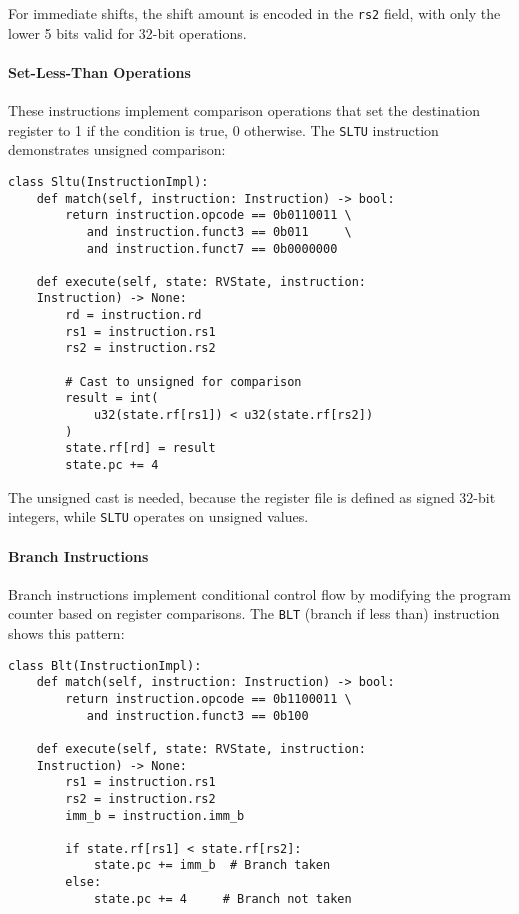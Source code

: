 \documentclass[sigconf]{acmart}
\begin{document}
For immediate shifts, the shift amount is encoded in the \texttt{rs2} field, with only the lower 5 bits valid for 32-bit operations.

\paragraph{Set-Less-Than Operations}
These instructions implement comparison operations that set the destination register to 1 if the condition is true, 0 otherwise. The \texttt{SLTU} instruction demonstrates unsigned comparison:

\begin{verbatim}
class Sltu(InstructionImpl):
    def match(self, instruction: Instruction) -> bool:
        return instruction.opcode == 0b0110011 \
           and instruction.funct3 == 0b011     \
           and instruction.funct7 == 0b0000000
    
    def execute(self, state: RVState, instruction: 
    Instruction) -> None:
        rd = instruction.rd
        rs1 = instruction.rs1
        rs2 = instruction.rs2
        
        # Cast to unsigned for comparison
        result = int(
            u32(state.rf[rs1]) < u32(state.rf[rs2])
        )
        state.rf[rd] = result
        state.pc += 4
\end{verbatim}

The unsigned cast is needed, because the register file is defined as signed 32-bit integers, while \texttt{SLTU} operates on unsigned values.

\paragraph{Branch Instructions}
Branch instructions implement conditional control flow by modifying the program counter based on register comparisons. The \texttt{BLT} (branch if less than) instruction shows this pattern:

\begin{verbatim}
class Blt(InstructionImpl):
    def match(self, instruction: Instruction) -> bool:
        return instruction.opcode == 0b1100011 \
           and instruction.funct3 == 0b100
    
    def execute(self, state: RVState, instruction: 
    Instruction) -> None:
        rs1 = instruction.rs1
        rs2 = instruction.rs2
        imm_b = instruction.imm_b

        if state.rf[rs1] < state.rf[rs2]:
            state.pc += imm_b  # Branch taken
        else:
            state.pc += 4     # Branch not taken
\end{verbatim}
\end{document}
